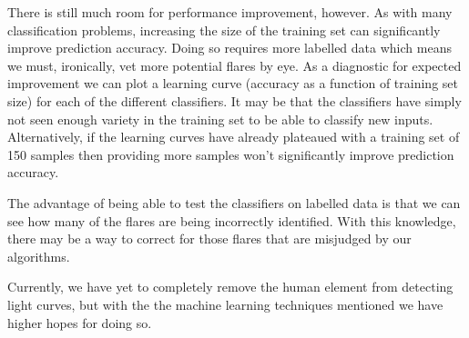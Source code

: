\documentclass[11pt]{article}
\begin{document}
There is still much room for performance improvement, however.  As
with many classification problems, increasing the size of the training
set can significantly improve prediction accuracy.  Doing so requires
more labelled data which means we must, ironically, vet more potential
flares by eye.  As a diagnostic for expected improvement we can plot a
learning curve (accuracy as a function of training set size) for each
of the different classifiers.  It may be that the classifiers have
simply not seen enough variety in the training set to be able to
classify new inputs. Alternatively, if the learning curves have
already plateaued with a training set of 150 samples then providing
more samples won't significantly improve prediction accuracy.

The advantage of being able to test the classifiers on labelled data
is that we can see how many of the flares are being incorrectly
identified.  With this knowledge, there may be a way to correct for
those flares that are misjudged by our algorithms.

Currently, we have yet to completely remove the human element from
detecting light curves, but with the the machine learning techniques
mentioned we have higher hopes for doing so.
\end{document}
